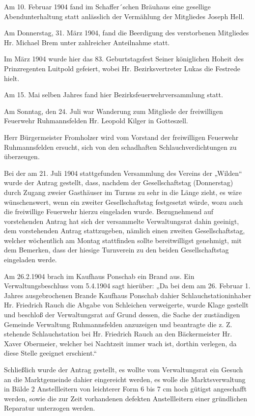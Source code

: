 \documentclass[12pt,a4paper]{book}
\begin{document}
Am 10. Februar 1904 fand im Schaffer´schen Bräuhaus eine gesellige
Abendunterhaltung statt anlässlich der Vermählung der Mitgliedes Joseph Hell.

Am Donnerstag, 31. März 1904, fand die Beerdigung des verstorbenen Mitgliedes
Hr. Michael Brem unter zahlreicher Anteilnahme statt.

Im März 1904 wurde hier das 83. Geburtstagsfest Seiner königlichen Hoheit des
Prinzregenten Luitpold gefeiert, wobei Hr. Bezirksvertreter Lukas die Festrede
hielt.

Am 15. Mai selben Jahres fand hier Bezirksfeuerwehrversammlung statt.

Am Sonntag, den 24. Juli war Wanderung zum Mitgliede der freiwilligen Feuerwehr
Ruhmannsfelden Hr. Leopold Kilger in Gotteszell.

Herr Bürgermeister Fromholzer wird vom Vorstand der freiwilligen Feuerwehr
Ruhmannsfelden ersucht, sich von den schadhaften Schlauchverdichtungen zu
überzeugen.

Bei der am 21. Juli 1904 stattgefunden Versammlung des Vereins der „Wilden“
wurde der Antrag gestellt, dass, nachdem der Gesellschaftstag (Donnerstag) durch
Zugang zweier Gasthäuser im Turnus zu sehr in die Länge zieht, es wäre
wünschenswert, wenn ein zweiter Gesellschaftstag festgesetzt würde, wozu auch
die freiwillige Feuerwehr hierzu eingeladen wurde. Bezugnehmend auf vorstehenden
Antrag hat sich der versammelte Verwaltungsrat dahin geeinigt, dem vorstehenden
Antrag stattzugeben, nämlich einen zweiten Gesellschaftstag, welcher wöchentlich
am Montag stattfinden sollte bereitwilligst genehmigt, mit dem Bemerken, dass
der hiesige Turnverein zu den beiden Gesellschaftstag eingeladen werde.

Am 26.2.1904 brach im Kaufhaus Ponschab ein Brand aus. Ein Verwaltungsbeschluss
vom 5.4.1904 sagt hierüber: „Da bei dem am 26. Februar 1. Jahres ausgebrochenen
Brande Kaufhaus Ponschab dahier Schlauchstationinhaber Hr. Friedrich Rauch die
Abgabe von Schleichen verweigerte, wurde Klage gestellt und beschloß der
Verwaltungsrat auf Grund dessen, die Sache der zuständigen Gemeinde Verwaltung
Ruhmannsfelden anzuzeigen und beantragte die z. Z. stehende Schlauchstation bei
Hr. Friedrich Rauch an den Bäckermeister Hr. Xaver Obermeier, welcher bei
Nachtzeit immer wach ist, dorthin verlegen, da diese Stelle geeignet erschient.“

Schließlich wurde der Antrag gestellt, es wollte vom Verwaltungsrat ein Gesuch
an die Marktgemeinde dahier eingereicht werden, es wolle die Marktsverwaltung in
Bälde 2 Anstellleitern von leichterer Form 6 bis 7 cm hoch gütigst angeschafft
werden, sowie die zur Zeit vorhandenen defekten Anstellleitern einer gründlichen
Reparatur unterzogen werden.
\end{document}
